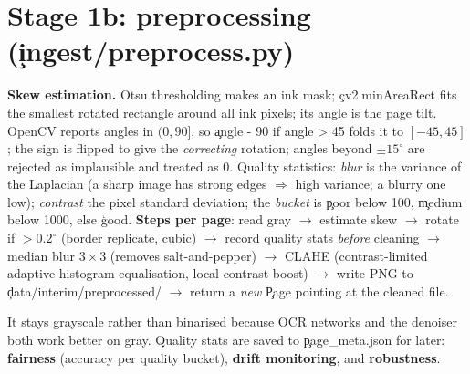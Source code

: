 \section{Stage 1b: preprocessing (\c{ingest/preprocess.py})}
\textbf{Skew estimation.} Otsu thresholding makes an ink mask; \c{cv2.minAreaRect} fits the smallest rotated rectangle around all ink pixels; its angle is the page tilt. OpenCV reports angles in $(0,90]$, so \c{angle - 90 if angle > 45} folds it to $[-45,45]$; the sign is flipped to give the \emph{correcting} rotation; angles beyond $\pm15^\circ$ are rejected as implausible and treated as $0$.
Quality statistics: \emph{blur} is the variance of the Laplacian (a sharp image has strong edges $\Rightarrow$ high variance; a blurry one low); \emph{contrast} the pixel standard deviation; the \emph{bucket} is \c{poor} below 100, \c{medium} below 1000, else \c{good}.
\textbf{Steps per page}: read gray $\to$ estimate skew $\to$ rotate if $>0.2^\circ$ (border replicate, cubic) $\to$ record quality stats \emph{before} cleaning $\to$ median blur $3\times3$ (removes salt-and-pepper) $\to$ CLAHE (contrast-limited adaptive histogram equalisation, local contrast boost) $\to$ write PNG to \c{data/interim/preprocessed/} $\to$ return a \emph{new} \c{Page} pointing at the cleaned file.
\begin{why}
It stays grayscale rather than binarised because OCR networks and the denoiser both work better on gray. Quality stats are saved to \c{page\_meta.json} for later: \textbf{fairness} (accuracy per quality bucket), \textbf{drift monitoring}, and \textbf{robustness}.
\end{why}

